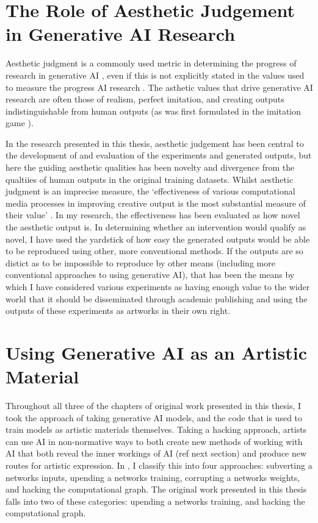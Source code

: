 \section{The Role of Aesthetic Judgement in Generative AI Research}

Aesthetic judgment is a commonly used metric in determining the progress of research in generative AI \citep{larsen2016autoencoding}, even if this is not explicitly stated in the values used to measure the progress AI research \citep{birhane2022values}.
The asthetic values that drive generative AI research are often those of realism, perfect imitation, and creating outputs indistinguishable from human outputs (as was first formulated in the imitation game \citep{machinery1950computing}). 

In the research presented in this thesis, aesthetic judgement has been central to the development of and evaluation of the experiments and generated outputs, but here the guiding aesthetic qualities has been novelty and divergence from the qualtiies of human outputs in the original training datasets.
Whilst aesthetic judgment is an imprecise measure, the `effectiveness of various computational media processes in improving creative output is the most substantial measure of their value' \citep{brown2009integrating}. 
In my research, the effectiveness has been evaluated as how novel the aesthetic output is. 
In determining whether an intervention would qualify as novel, I have used the yardstick of how easy the generated outputs would be able to be reproduced using other, more conventional methods.
If the outputs are so distict as to be impossible to reproduce by other means (including more conventional approaches to using generative AI), that has been the means by which I have considered various experiments as having enough value to the wider world that it should be disseminated through academic publishing and using the outputs of these experiments as artworks in their own right.

\section{Using Generative AI as an Artistic Material}

Throughout all three of the chapters of original work presented in this thesis, I took the approach of taking generative AI models, and the code that is used to train models as artistic materials themselves.
Taking a hacking approach, artists can use AI in non-normative ways to both create new methods of working with AI that both reveal the inner workings of AI (ref next section) and produce new routes for artistic expression. 
In \cite{broad2024using}, I classify this into four approaches: subverting a networks inputs, upending a networks training, corrupting a networks weights, and hacking the computational graph. 
The original work presented in this thesis falls into two of these categories: upending a networks training, and hacking the computational graph.

